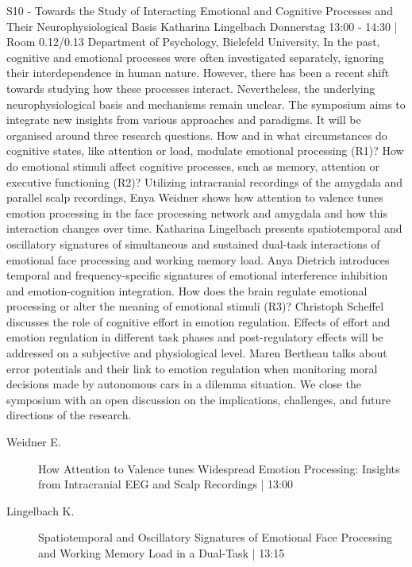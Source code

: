 
            \begin{symposium}
            {S10 - Towards the Study of Interacting Emotional and Cognitive Processes and Their Neurophysiological Basis}
            {Katharina Lingelbach}
            {Donnerstag 13:00 - 14:30 | Room 0.12/0.13}
            {Department of Psychology, Bielefeld University,}
            In the past, cognitive and emotional processes were often investigated separately, ignoring their interdependence in human nature. However, there has been a recent shift towards studying how these processes interact. Nevertheless, the underlying neurophysiological basis and mechanisms remain unclear.
The symposium aims to integrate new insights from various approaches and paradigms. It will be organised around three research questions. How and in what circumstances do cognitive states, like attention or load, modulate emotional processing (R1)? How do emotional stimuli affect cognitive processes, such as memory, attention or executive functioning (R2)?
Utilizing intracranial recordings of the amygdala and parallel scalp recordings, Enya Weidner shows how attention to valence tunes emotion processing in the face processing network and amygdala and how this interaction changes over time. Katharina Lingelbach presents spatiotemporal and oscillatory signatures of simultaneous and sustained dual-task interactions of emotional face processing and working memory load. Anya Dietrich introduces temporal and frequency-specific signatures of emotional interference inhibition and emotion-cognition integration.
How does the brain regulate emotional processing or alter the meaning of emotional stimuli (R3)?
Christoph Scheffel discusses the role of cognitive effort in emotion regulation. Effects of effort and emotion regulation in different task phases and post-regulatory effects will be addressed on a subjective and physiological level. Maren Bertheau talks about error potentials and their link to emotion regulation when monitoring moral decisions made by autonomous cars in a dilemma situation.
We close the symposium with an open discussion on the implications, challenges, and future directions of the research.
            \begin{description}    
            
                \item [ Weidner E.] How Attention to Valence tunes Widespread Emotion Processing: Insights from Intracranial EEG and Scalp Recordings \textcolor{mygray}{ | 13:00}    
                
                \item [ Lingelbach K.] Spatiotemporal and Oscillatory Signatures of Emotional Face Processing and Working Memory Load in a Dual-Task \textcolor{mygray}{ | 13:15}    
                

\end{description}
\end{symposium}
